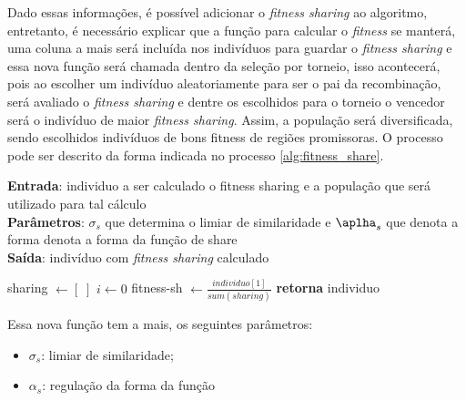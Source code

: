 \documentclass[a4paper, 12pt]{article}
\newcommand{\fitness}{\textit{fitness}\xspace}
\newcommand{\fitsha}{\textit{fitness sharing}\xspace}
\newenvironment{brprocess}[1][]
  {\begin{algorithm}[#1]
     \selectlanguage{brazilian}%
     \floatname{algorithm}{Processo}%
     \renewcommand{\algorithmicif}{\textbf{se}}%
     \renewcommand{\algorithmicfor}{\textbf{para}}%
     \renewcommand{\algorithmicdo}{\textbf{faça}}%
     \renewcommand{\algorithmicthen}{\textbf{faça}}%
     \renewcommand{\algorithmicend}{\textbf{fim}}%
     \renewcommand{\algorithmicwhile}{\textbf{enquanto}}%
     \renewcommand{\algorithmicelse}{\textbf{caso contrário}}%
  }
  {\end{algorithm}}
\begin{document}
Dado essas informações, é possível adicionar o \fitsha ao algoritmo, entretanto, é necessário explicar que a função para calcular o \fitness se manterá, uma coluna a mais será incluída nos indivíduos para guardar o \fitsha e essa nova função será chamada dentro da seleção por torneio, isso acontecerá, pois ao escolher um indivíduo aleatoriamente para ser o pai da recombinação, será avaliado o \fitsha e dentre os escolhidos para o torneio o vencedor será o indivíduo de maior \fitsha. Assim, a população será diversificada, sendo escolhidos indivíduos de bons fitness de regiões promissoras. O processo pode ser descrito da forma indicada no processo \ref{alg:fitness_share}.
\begin{brprocess}[!ht]
    \cprotect\caption{Operador de \fitsha (\verb|fitness_share(individuo,|
    \verb|populacao,|\sigma_s, \alpha_s)}
    \textbf{Entrada}: individuo a ser calculado o fitness sharing e a população que será utilizado para tal cálculo\\
    \textbf{Parâmetros}: $\sigma_s$ que determina o limiar de similaridade e $\aplha_s$ que denota a forma denota a forma da função de share\\
    \textbf{Saída}: indivíduo com \fitsha calculado
    \begin{algorithmic}
        \State sharing $\gets [\;]$
        \State $i \gets 0$
            \Else
            \EndIf       
        \EndFor        
        \State fitness-sh $\gets \frac{individuo[1]}{sum(sharing)}$
        \State \textbf{retorna} individuo
    \end{algorithmic}
    \label{alg:fitness_share}
\end{brprocess}

Essa nova função tem a mais, os seguintes parâmetros:
\begin{itemize}
    \item $\sigma_s$: limiar de similaridade;
    \item $\alpha_s$: regulação da forma da função
\end{itemize}
\end{document}
